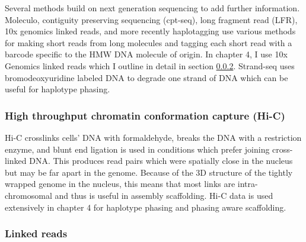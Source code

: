 \par{
Several methods build on next generation sequencing to add further information. Moleculo\cite{moleculo}, contiguity preserving sequencing (cpt-seq)\cite{cptseq}, long fragment read (LFR)\cite{LFR}, 10x genomics linked reads\cite{10xlinked}, and more recently haplotagging\cite{haplotagging} use various methods for making short reads from long molecules and tagging each short read with a barcode specific to the HMW DNA molecule of origin. In chapter 4, I use 10x Genomics linked reads which I outline in detail in section \ref{section:linkedreads}. Strand-seq uses bromodeoxyuridine labeled DNA to degrade one strand of DNA which can be useful for haplotype phasing\cite{strandseq}\cite{strandseq5}\cite{strandseq2}\cite{strandseq3}. 
}

\subsubsection{High throughput chromatin conformation capture (Hi-C)}\label{section:hic}

\par{
Hi-C crosslinks cells' DNA with formaldehyde, breaks the DNA with a restriction enzyme, and blunt end ligation is used in conditions which prefer joining cross-linked DNA\cite{hic1}\cite{hic2}\cite{hic3}\cite{hic4}. This produces read pairs which were spatially close in the nucleus but may be far apart in the genome. Because of the 3D structure of the tightly wrapped genome in the nucleus, this means that most links are intra-chromosomal and thus is useful in assembly scaffolding\cite{SALSA}. Hi-C data is used extensively in chapter 4 for haplotype phasing and phasing aware scaffolding.
}


\subsubsection{Linked reads}\label{section:linkedreads}

